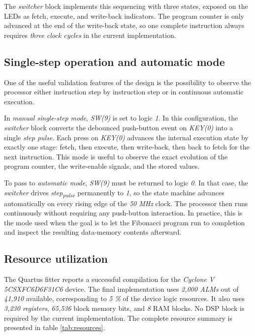 \documentclass[a4paper,11pt]{scrartcl}
\begin{document}
The \emph{switcher} block implements this sequencing with three states, exposed on the LEDs as fetch, execute, and write-back indicators. The program counter is only advanced at the end of the write-back state, so one complete instruction always requires \emph{three clock cycles} in the current implementation.
\subsection{Single-step operation and automatic mode}
\label{sec:org4134bf4}

One of the useful validation features of the design is the possibility to observe the processor either instruction step by instruction step or in continuous automatic execution.

In \emph{manual single-step mode}, \emph{SW(9)} is set to logic \emph{1}. In this configuration, the \emph{switcher} block converts the debounced push-button event on \emph{KEY(0)} into a single \emph{step pulse}. Each press on \emph{KEY(0)} advances the internal execution state by exactly one stage: fetch, then execute, then write-back, then back to fetch for the next instruction. This mode is useful to observe the exact evolution of the program counter, the write-enable signals, and the stored values.

To pass to \emph{automatic mode}, \emph{SW(9)} must be returned to logic \emph{0}. In that case, the \emph{switcher} drives \emph{step\textsubscript{pulse}} permanently to \emph{1}, so the state machine advances automatically on every rising edge of the \emph{50 MHz} clock. The processor then runs continuously without requiring any push-button interaction. In practice, this is the mode used when the goal is to let the Fibonacci program run to completion and inspect the resulting data-memory contents afterward.
\subsection{Resource utilization}
\label{sec:org2ea1a2f}

The Quartus fitter reports a successful compilation for the \emph{Cyclone V 5CSXFC6D6F31C6} device. The final implementation uses \emph{2,000 ALMs} out of \emph{41,910} available, corresponding to \emph{5 \%} of the device logic resources. It also uses \emph{3,230 registers}, \emph{65,536} block memory bits, and \emph{8} RAM blocks. No DSP block is required by the current implementation. The complete resource summary is presented in table \ref{tab:resources}.
\end{document}
